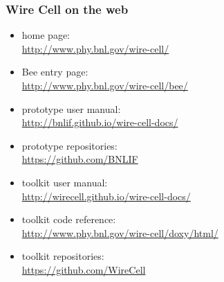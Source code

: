 \begin{frame}
  \frametitle{Wire Cell on the web}

  \begin{itemize}
  \item home page: \\ \url{http://www.phy.bnl.gov/wire-cell/}
  \item Bee entry page: \\ \url{http://www.phy.bnl.gov/wire-cell/bee/}
  \item prototype user manual: \\ \url{http://bnlif.github.io/wire-cell-docs/}
  \item prototype repositories: \\ \url{https://github.com/BNLIF}
  \item toolkit user manual: \\ \url{http://wirecell.github.io/wire-cell-docs/}
  \item toolkit code reference: \\ \url{http://www.phy.bnl.gov/wire-cell/doxy/html/}
  \item toolkit repositories: \\ \url{https://github.com/WireCell}
  \end{itemize}
\end{frame}
